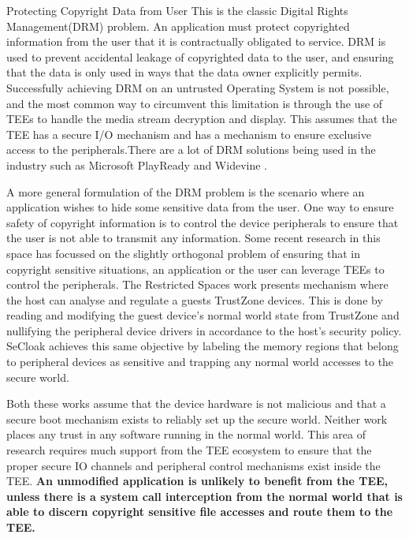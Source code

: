 \begin{subsection}{Protecting Copyright Data from User}
This is the classic Digital Rights Management(DRM) problem. An application must
protect copyrighted information from the user that it is contractually obligated
to service. DRM is used to prevent accidental leakage of copyrighted data to the
user, and ensuring that the data is only used in ways that the data owner
explicitly permits. Successfully achieving DRM on an untrusted Operating System
is not possible, and the most common way to circumvent this limitation is
through the use of TEEs to handle the media stream decryption and display.  This
assumes that the TEE has a secure I/O mechanism  and has a mechanism to ensure
exclusive access to the peripherals.There are a lot of DRM solutions being used
in the industry such as Microsoft PlayReady\cite{microsoftplayready} and
Widevine \cite{widevine}. 

A more general formulation of the DRM problem is the scenario where an
application wishes to hide some sensitive data from the user. One way to ensure
safety of copyright information is to control the device peripherals to ensure
that the user is not able to transmit any information. Some recent research
\cite{restrictedspaces, SeCloak} in this space has focussed on the slightly
orthogonal problem of ensuring that in copyright sensitive situations, an
application or the user can leverage TEEs to control the peripherals. The
Restricted Spaces\cite{restrictedspaces} work presents mechanism  where the host
can analyse and regulate a guests TrustZone devices. This is done by reading and
modifying the guest device's normal world state from TrustZone and nullifying
the peripheral device drivers in accordance to the host's security policy.
SeCloak\cite{SeCloak} achieves this same objective by labeling the memory
regions that belong to peripheral devices as sensitive and trapping any normal
world accesses to the secure world. %

Both these works assume that the device hardware is not malicious and that a
secure boot mechanism exists to reliably set up the secure world. 
Neither work places any trust in any software running in the normal world. This
area of research requires much support from the TEE ecosystem to ensure that the
proper secure IO channels and peripheral control mechanisms exist inside the
TEE. \textbf{An unmodified application is unlikely to benefit from the TEE,
unless there is a system call interception from the normal world that is able to
discern copyright sensitive file accesses and route them to the TEE.}

\end{subsection}
    

